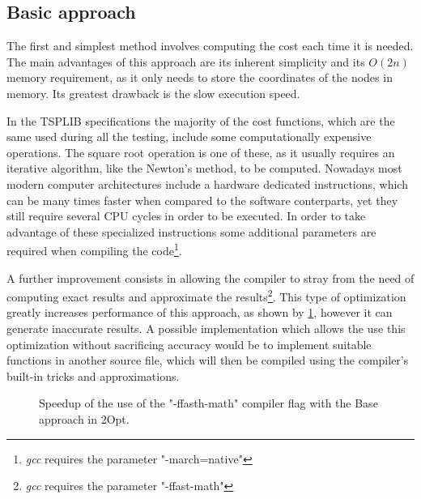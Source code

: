 \subsection{Basic approach}

The first and simplest method involves computing the cost each time it is needed. 
The main advantages of this approach are its inherent simplicity and its $O(2n)$ memory requirement, as it only needs to store the coordinates of the nodes in memory.
Its greatest drawback is the slow execution speed.

In the TSPLIB specifications the majority of the cost functions, which are the same used during all the testing, include some computationally expensive operations.
The square root operation is one of these, as it usually requires an iterative algorithm, like the Newton's method\cite{newtonMethod}, to be computed.
Nowadays most modern computer architectures include a hardware dedicated instructions, which can be many times faster when compared to the software conterparts, yet they still require several CPU cycles in order to be executed.
In order to take advantage of these specialized instructions some additional parameters are required when compiling the code\footnote{\textit{gcc} requires the parameter "-march=native"}.

A further improvement consists in allowing the compiler to stray from the need of computing exact results and approximate the results\footnote{\textit{gcc} requires the parameter "-ffast-math"}.
This type of optimization greatly increases performance of this approach, as shown by \figurename{ \ref{fig:baseHWSpecific}}, however it can generate inaccurate results.
A possible implementation which allows the use this optimization without sacrificing accuracy would be to implement suitable functions in another source file, which will then be compiled using the compiler's built-in tricks and approximations.

\begin{figure}[htbp]
    \centering
    \caption{Speedup of the use of the "-ffasth-math" compiler flag with the Base approach in 2Opt.} \label{fig:baseHWSpecific}
\end{figure}

